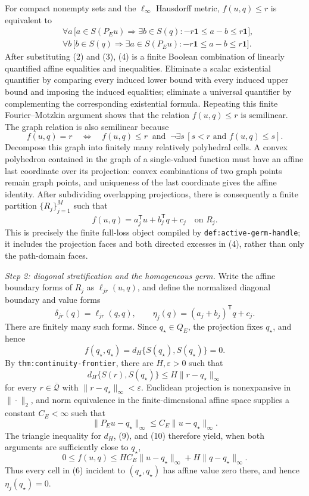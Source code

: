 For compact nonempty sets and the \(\ell_\infty\) Hausdorff metric, \(f(u,q)\leq r\) is equivalent to
\[
\begin{split}
 &\forall a\,\bigl[a\in S(P_Eu)\Longrightarrow
       \exists b\in S(q):-r\mathbf 1\leq a-b\leq r\mathbf 1\bigr],\\
 &\forall b\,\bigl[b\in S(q)\Longrightarrow
       \exists a\in S(P_Eu):-r\mathbf 1\leq a-b\leq r\mathbf 1\bigr].
\end{split}
\tag{4}
\]
After substituting (2) and (3), (4) is a finite Boolean combination of linearly quantified affine equalities and inequalities.  Eliminate a scalar existential quantifier by comparing every induced lower bound with every induced upper bound and imposing the induced equalities; eliminate a universal quantifier by complementing the corresponding existential formula.  Repeating this finite Fourier--Motzkin argument shows that the relation \(f(u,q)\leq r\) is semilinear.  The graph relation is also semilinear because
\[
 f(u,q)=r
 \quad\Longleftrightarrow\quad
 f(u,q)\leq r\ \text{ and }\
 \neg\exists s\,[s<r\text{ and }f(u,q)\leq s].
\tag{5}
\]
Decompose this graph into finitely many relatively polyhedral cells.  A convex polyhedron contained in the graph of a single-valued function must have an affine last coordinate over its projection: convex combinations of two graph points remain graph points, and uniqueness of the last coordinate gives the affine identity.  After subdividing overlapping projections, there is consequently a finite partition \(\{R_j\}_{j=1}^M\) such that
\[
 f(u,q)=a_j^{\mathsf T}u+b_j^{\mathsf T}q+c_j
 \quad\text{on }R_j.
\tag{6}
\]
This is precisely the finite full-loss object compiled by \texttt{def:active-germ-handle}; it includes the projection faces and both directed excesses in (4), rather than only the path-domain faces.

\emph{Step 2: diagonal stratification and the homogeneous germ.}
Write the affine boundary forms of \(R_j\) as \(\ell_{jr}(u,q)\), and define the normalized diagonal boundary and value forms
\[
 \delta_{jr}(q)=\ell_{jr}(q,q),
 \qquad
 \eta_j(q)=(a_j+b_j)^{\mathsf T}q+c_j.
\tag{7}
\]
There are finitely many such forms.  Since \(q_\star\in Q_E\), the projection fixes \(q_\star\), and hence
\[
 f(q_\star,q_\star)=d_H\{S(q_\star),S(q_\star)\}=0.
\tag{8}
\]
By \texttt{thm:continuity-frontier}, there are \(H,\varepsilon>0\) such that
\[
 d_H\{S(r),S(q_\star)\}\leq H\|r-q_\star\|_\infty
\tag{9}
\]
for every \(r\in\overline{\mathcal Q}\) with \(\|r-q_\star\|_\infty<\varepsilon\).  Euclidean projection is nonexpansive in \(\|\cdot\|_2\), and norm equivalence in the finite-dimensional affine space supplies a constant \(C_E<\infty\) such that
\[
 \|P_Eu-q_\star\|_\infty
 \leq C_E\|u-q_\star\|_\infty.
\tag{10}
\]
The triangle inequality for \(d_H\), (9), and (10) therefore yield, when both arguments are sufficiently close to \(q_\star\),
\[
 0\leq f(u,q)
 \leq H C_E\|u-q_\star\|_\infty
      +H\|q-q_\star\|_\infty.
\tag{11}
\]
Thus every cell in (6) incident to \((q_\star,q_\star)\) has affine value zero there, and hence \(\eta_j(q_\star)=0\).

